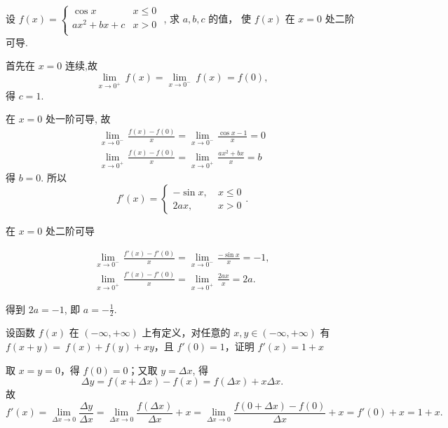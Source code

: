 \begin{problem} 设 $f\left( x \right) =  \begin{cases}
\cos x & x \leq 0 \\
ax^{2} + bx + c & x > 0 \\
\end{cases}  $ , 求 $a,b,c$ 的值， 使 $f\left( x \right)$
在 $x = 0$ 处二阶可导.

\begin{solution}
	首先在 $x = 0$ 连续,故
$$\lim_{x \rightarrow 0^{+}}{\,f}\left( x \right) = \lim_{x \rightarrow 0^{-}}{\ f}\left( x \right)\mspace{2mu} = f(0),$$
得 $c = 1$.

在 $x = 0$ 处一阶可导,
故
$$\begin{matrix}
\displaystyle \lim_{x \rightarrow 0^{-}}\mspace{2mu}\frac{f(x) - f(0)}{x} = \lim_{x \rightarrow 0^{-}}\mspace{2mu}\frac{\cos x - 1}{x} = 0 \\
\displaystyle \lim_{x \rightarrow 0^{+}}\mspace{2mu}\frac{f(x) - f(0)}{x} = \lim_{x \rightarrow 0^{+}}\mspace{2mu}\frac{ax^{2} + bx}{x} = b 
\end{matrix}$$
得 $b = 0$. 
所以
$$f'(x) =\begin{cases}
-\sin x, \ &x\leq 0\\
2ax, \ &x>0
\end{cases} .$$

在 $x = 0$ 处二阶可导

$$\begin{matrix}
\displaystyle \lim_{x \rightarrow 0^{-}}\mspace{2mu}\frac{f'(x) - f'(0)}{x} = \lim_{x \rightarrow 0^{-}}\mspace{2mu}\frac{- \sin x}{x} = - 1, \\
\displaystyle \lim_{x \rightarrow 0^{+}}\mspace{2mu}\frac{f'(x) - f'(0)}{x} = \lim_{x \rightarrow 0^{+}}\mspace{2mu}\frac{2ax}{x} = 2a.
\end{matrix}$$

得到 $2a = - 1$, 即 $\displaystyle a = - \frac{1}{2}$.
\end{solution}


\end{problem}

\begin{problem}
	设函数 $f(x)$ 在 $( - \infty, + \infty)$ 上有定义，对任意的
	$x,y \in ( - \infty, + \infty)$ 有
	$f\left( x + y \right) = {\ f}\left( x \right) + f\left( y \right) + xy$，且
	$f'(0) = 1$，证明 $f'\left( x \right) = 1 + x$
	
\begin{solution}
取 $x = y = 0$，得 $f(0) = 0$；又取 $y = {\Delta x}$, 得
$$\Delta y = f(x + \Delta x) - f(x) = f(\Delta x) + x\Delta x.$$
故
$$
f'(x) = \lim_{\Delta x \rightarrow 0}\frac{\Delta y}{\Delta x} = \lim_{\Delta x \rightarrow 0}\frac{f(\Delta x)}{\Delta x} + x = \lim_{\Delta x \rightarrow 0}\frac{f(0 + \Delta x) - f(0)}{\Delta x} + x = f'(0) + x = 1 + x.$$
\end{solution}

\end{problem}

